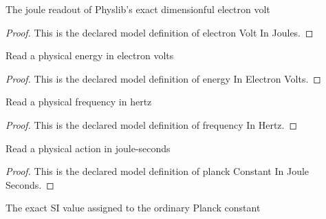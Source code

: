 \begin{definition}
  \label{def:physics:phyx-mini-0579:phyxminiproblems-problemphyxmini0579-electronvoltinjoules}
  The joule readout of Physlib's exact dimensionful electron volt
\end{definition}
\begin{proof}
  This is the declared model definition of electron Volt In Joules.
\end{proof}
\begin{definition}
  \label{def:physics:phyx-mini-0579:phyxminiproblems-problemphyxmini0579-energyinelectronvolts}
  Read a physical energy in electron volts
\end{definition}
\begin{proof}
  This is the declared model definition of energy In Electron Volts.
\end{proof}
\begin{definition}
  \label{def:physics:phyx-mini-0579:phyxminiproblems-problemphyxmini0579-frequencyinhertz}
  Read a physical frequency in hertz
\end{definition}
\begin{proof}
  This is the declared model definition of frequency In Hertz.
\end{proof}
\begin{definition}
  \label{def:physics:phyx-mini-0579:phyxminiproblems-problemphyxmini0579-planckconstantinjouleseconds}
  Read a physical action in joule-seconds
\end{definition}
\begin{proof}
  This is the declared model definition of planck Constant In Joule Seconds.
\end{proof}
\begin{definition}
  \label{def:physics:phyx-mini-0579:phyxminiproblems-problemphyxmini0579-planckconstantsivalue}
  The exact SI value assigned to the ordinary Planck constant
\end{definition}
